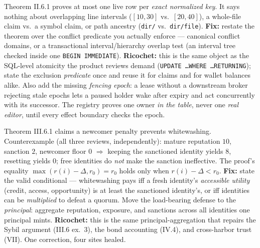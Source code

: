 \documentclass[11pt,a4paper]{article}
\begin{document}
\begin{change}
Theorem II.6.1 proves at most one live row per \emph{exact normalized key}. It says nothing about overlapping line intervals ($[10,30]$ vs.\ $[20,40]$), a whole-file claim vs.\ a symbol claim, or path ancestry (\texttt{dir/} vs.\ \texttt{dir/file}). \textbf{Fix:} restate the theorem over the conflict predicate you actually enforce --- canonical conflict domains, or a transactional interval/hierarchy overlap test (an interval tree checked inside one \texttt{BEGIN IMMEDIATE}). \textbf{Ricochet:} this is the same object as the SQL-level atomicity the product reviews demand (\texttt{UPDATE \ldots WHERE \ldots RETURNING}); state the exclusion \emph{predicate} once and reuse it for claims and for wallet balances alike. Also add the missing \emph{fencing epoch}: a lease without a downstream broker rejecting stale epochs lets a paused holder wake after expiry and act concurrently with its successor. The registry proves one owner \emph{in the table}, never one \emph{real editor}, until every effect boundary checks the epoch.
\end{change}

\begin{change}
Theorem III.6.1 claims a newcomer penalty prevents whitewashing. Counterexample (all three reviews, independently): mature reputation $10$, sanction $2$, newcomer floor $0$ $\Rightarrow$ keeping the sanctioned identity yields $8$, resetting yields $0$; free identities do \emph{not} make the sanction ineffective. The proof's equality $\max(r(i)-\Delta, r_0)=r_0$ holds only when $r(i)-\Delta < r_0$. \textbf{Fix:} state the valid conditional --- whitewashing pays iff a fresh identity's \emph{accessible utility} (credit, access, opportunity) is at least the sanctioned identity's, or iff identities can be \emph{multiplied} to defeat a quorum. Move the load-bearing defense to the \emph{principal}: aggregate reputation, exposure, and sanctions across all identities one principal mints. \textbf{Ricochet:} this is the same principal-aggregation that repairs the Sybil argument (III.6 ex.\ 3), the bond accounting (IV.4), and cross-harbor trust (VII). One correction, four sites healed.
\end{change}
\end{document}
